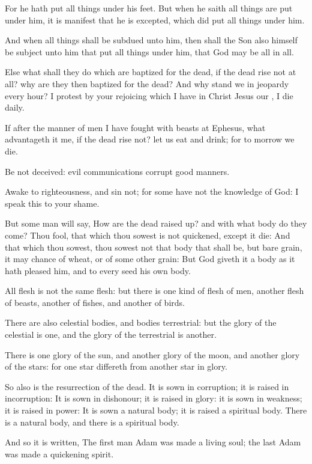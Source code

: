 \Verse For he hath put all things under his feet. But when he saith all things are put under him, it is manifest that he is excepted, which did put all things under him.

\Verse And when all things shall be subdued unto him, then shall the Son also himself be subject unto him that put all things under him, that God may be all in all.

\Verse Else what shall they do which are baptized for the dead, if the dead rise not at all? why are they then baptized for the dead?  \Verse And why stand we in jeopardy every hour?  \Verse I protest by your rejoicing which I have in Christ Jesus our \LORD, I die daily.

\Verse If after the manner of men I have fought with beasts at Ephesus, what advantageth it me, if the dead rise not? let us eat and drink; for to morrow we die.

\Verse Be not deceived: evil communications corrupt good manners.

\Verse Awake to righteousness, and sin not; for some have not the knowledge of God: I speak this to your shame.

\Verse But some man will say, How are the dead raised up? and with what body do they come?  \Verse Thou fool, that which thou sowest is not quickened, except it die: \Verse And that which thou sowest, thou sowest not that body that shall be, but bare grain, it may chance of wheat, or of some other grain: \Verse But God giveth it a body as it hath pleased him, and to every seed his own body.

\Verse All flesh is not the same flesh: but there is one kind of flesh of men, another flesh of beasts, another of fishes, and another of birds.

\Verse There are also celestial bodies, and bodies terrestrial: but the glory of the celestial is one, and the glory of the terrestrial is another.

\Verse There is one glory of the sun, and another glory of the moon, and another glory of the stars: for one star differeth from another star in glory.

\Verse So also is the resurrection of the dead. It is sown in corruption; it is raised in incorruption: \Verse It is sown in dishonour; it is raised in glory: it is sown in weakness; it is raised in power: \Verse It is sown a natural body; it is raised a spiritual body. There is a natural body, and there is a spiritual body.

\Verse And so it is written, The first man Adam was made a living soul; the last Adam was made a quickening spirit.

